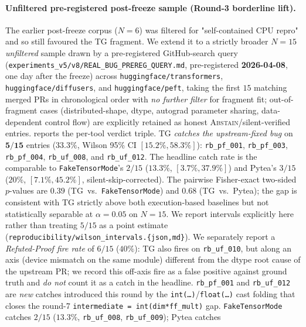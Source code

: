 \paragraph{Unfiltered pre-registered post-freeze sample
(Round-3 borderline lift).}
The earlier post-freeze corpus ($N{=}6$) was filtered for
"self-contained CPU repro" and so still favoured the \textsc{TG}
fragment.  We extend it to a strictly broader $N{=}15$
\emph{unfiltered} sample drawn by a pre-registered
GitHub-search query (\texttt{experiments\_v5/v8/REAL\_BUG\_PREREG\_QUERY.md},
pre-registered \textbf{2026-04-08}, one day after the freeze)
across \texttt{huggingface/transformers}, \texttt{huggingface/diffusers},
and \texttt{huggingface/peft}, taking the first $15$ matching merged
PRs in chronological order with \emph{no further filter} for fragment
fit; out-of-fragment cases (distributed-shape, dtype, autograd
parameter sharing, data-dependent control flow) are explicitly
retained as honest \textsc{Abstain}/silent-verified entries.
 reports the per-tool verdict triple.
\textsc{TG} \emph{catches the upstream-fixed bug} on
$\mathbf{5/15}$ entries ($\mathbf{33.3\%}$, Wilson 95\% CI
$[15.2\%, 58.3\%]$): \texttt{rb\_pf\_001},
\texttt{rb\_pf\_003}, \texttt{rb\_pf\_004}, \texttt{rb\_uf\_008},
and \texttt{rb\_uf\_012}.  The headline catch rate is the comparable
to \texttt{FakeTensorMode}'s $2/15$ ($13.3\%$, $[3.7\%, 37.9\%]$) and
Pytea's $3/15$ ($20\%$, $[7.1\%, 45.2\%]$, silent-skip-corrected).
The pairwise Fisher-exact two-sided $p$-values are
$0.39$ (\textsc{TG}~vs.\ \texttt{FakeTensorMode}) and $0.68$
(\textsc{TG}~vs.\ Pytea); the gap is consistent with \textsc{TG}
strictly above both execution-based baselines but not statistically
separable at $\alpha{=}0.05$ on $N{=}15$.  We report intervals
explicitly here rather than treating $5/15$ as a point estimate
(\texttt{reproducibility/wilson\_intervals.\{json,md\}}).
We separately report a
\emph{Refuted-Proof fire rate} of $6/15$ ($40\%$): \textsc{TG}
also fires on \texttt{rb\_uf\_010}, but along an axis (device
mismatch on the same module) different from the dtype root cause
of the upstream PR; we record this off-axis fire as a false
positive against ground truth and \emph{do not} count it as a
catch in the headline.  \texttt{rb\_pf\_001} and
\texttt{rb\_uf\_012} are \emph{new} catches introduced this round
by the \texttt{int(\ldots)}/\texttt{float(\ldots)} cast folding
that closes the round-7 \texttt{intermediate = int(dim*ff\_mult)}
gap.
\texttt{FakeTensorMode} catches $2/15$ ($13.3\%$,
\texttt{rb\_uf\_008},  \texttt{rb\_uf\_009}); Pytea catches
